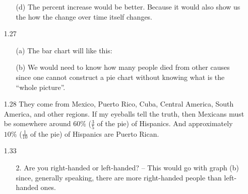 \documentclass[11pt, a4paper]{article}
\begin{document}
\begin{itemize}
\begin{itemize}
\item[(d)]
The percent increase would be better. Because it would also show us the how the change over time itself changes.
\end{itemize}

\item[]
\item[]

\item[1.27]
\begin{itemize}
\item[(a)]
The bar chart will like this:

\begin{center}
\end{center}

\item[]

\item[(b)]
We would need to know how many people died from other causes since one cannot
construct a pie chart without knowing what is the ``whole picture''.
\end{itemize}

\item[]
\item[]

\item[1.28]
They come from Mexico, Puerto Rico, Cuba, Central America, South America, and other regions.
If my eyeballs tell the truth, then Mexicans must be somewhere around $60\%$ ($\frac{3}{5}$ of the pie) of Hispanics.
And approximately $10\%$ ($\frac{1}{10}$ of the pie) of Hispanics are Puerto Rican.

\item[]
\item[]

\item[1.33]
\begin{itemize}
\item[2.]
Are you right-handed or left-handed? -- This would go with graph (b)
since, generally speaking, there are more right-handed people than left-handed ones.


\end{itemize}
\end{itemize}
\end{document}
